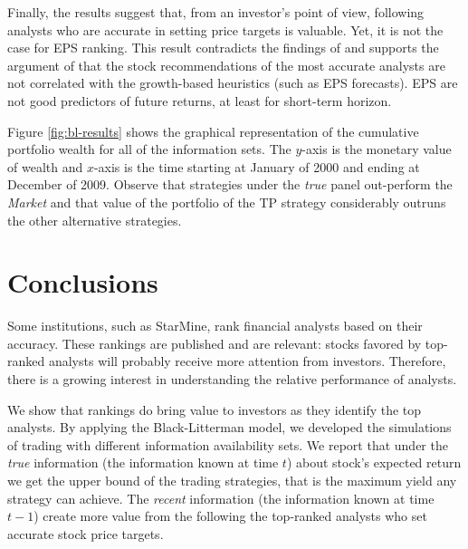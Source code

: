 \documentclass{article}
\newcommand{\tr}{\textit{true}}
\newcommand{\naive}{\textit{recent}}
\newcommand{\default}{\textit{all-time}}
\begin{document}


Finally, the results suggest that, from an investor's point of view, following analysts who are accurate in setting price targets is valuable. Yet, it is not the case for EPS ranking.  This result contradicts the findings of \cite{bradshaw2004} and supports the argument of \cite{simon2011} that the stock recommendations of the most accurate analysts are not correlated with the growth-based heuristics (such as EPS forecasts). EPS are not good predictors of future returns, at least for short-term horizon.

Figure \ref{fig:bl-results} shows the graphical representation of the cumulative portfolio wealth for all of the information sets. The $y$-axis is the monetary value of wealth and $x$-axis is the time starting at January of 2000 and ending at December of 2009. Observe that strategies under the \tr{} panel out-perform the \emph{Market} and that value of the portfolio of the TP strategy considerably outruns the other alternative strategies.

\section{Conclusions}
\label{sec:conclusion}

Some institutions, such as StarMine, rank financial analysts based on their accuracy. These rankings are published and are relevant: stocks favored by top-ranked analysts will probably receive more attention from investors. Therefore, there is a growing interest in understanding the relative performance of analysts.

We show that rankings do bring value to investors as they identify the top analysts. By applying the Black-Litterman model, we developed the simulations of trading with different information availability sets. We report that under the \tr{} information (the information known at time $t$) about stock's expected return we get the upper bound of the trading strategies, that is the maximum yield any strategy can achieve. The \naive{} information (the information known at time $t-1$) create more value from the following the top-ranked analysts who set accurate stock price targets. %
\end{document}
